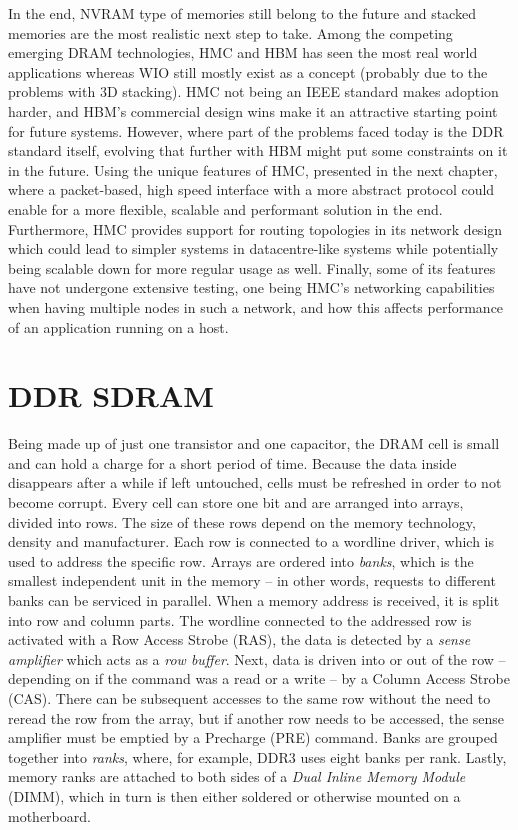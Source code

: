In the end, NVRAM type of memories still belong to the future and stacked memories are the most realistic next step to take. Among the competing emerging DRAM technologies, HMC and HBM has seen the most real world applications whereas WIO still mostly exist as a concept (probably due to the problems with 3D stacking). HMC not being an IEEE standard makes adoption harder, and HBM's commercial design wins make it an attractive starting point for future systems. However, where part of the problems faced today is the DDR standard itself, evolving that further with HBM might put some constraints on it in the future. Using the unique features of HMC, presented in the next chapter, where a packet-based, high speed interface with a more abstract protocol could enable for a more flexible, scalable and performant solution in the end. Furthermore, HMC provides support for routing topologies in its network design which could lead to simpler systems in datacentre-like systems while potentially being scalable down for more regular usage as  well. Finally, some of its features have not undergone extensive testing, one being HMC's networking capabilities when having multiple nodes in such a network, and how this affects performance of an application running on a host.


\section{DDR SDRAM}
Being made up of just one transistor and one capacitor, the DRAM cell is small and can hold a charge for a short period of time. Because the data inside disappears after a while if left untouched, cells must be refreshed in order to not become corrupt. Every cell can store one bit and are arranged into arrays, divided into rows. The size of these rows depend on the memory technology, density and manufacturer. Each row is connected to a wordline driver, which is used to address the specific row. Arrays are ordered into \emph{banks}, which is the smallest independent unit in the memory -- in other words, requests to different banks can be serviced in parallel. When a memory address is received, it is split into row and column parts. The wordline connected to the addressed row is activated with a Row Access Strobe (RAS), the data is detected by a \emph{sense amplifier} which acts as a \emph{row buffer}. Next, data is driven into or out of the row -- depending on if the command was a read or a write -- by a Column Access Strobe (CAS). There can be subsequent accesses to the same row without the need to reread the row from the array, but if another row needs to be accessed, the sense amplifier must be emptied by a Precharge (PRE) command. Banks are grouped together into \emph{ranks}, where, for example, DDR3 uses eight banks per rank. Lastly, memory ranks are attached to both sides of a \emph{Dual Inline Memory Module} (DIMM), which in turn is then either soldered or otherwise mounted on a motherboard. 
\bigskip

